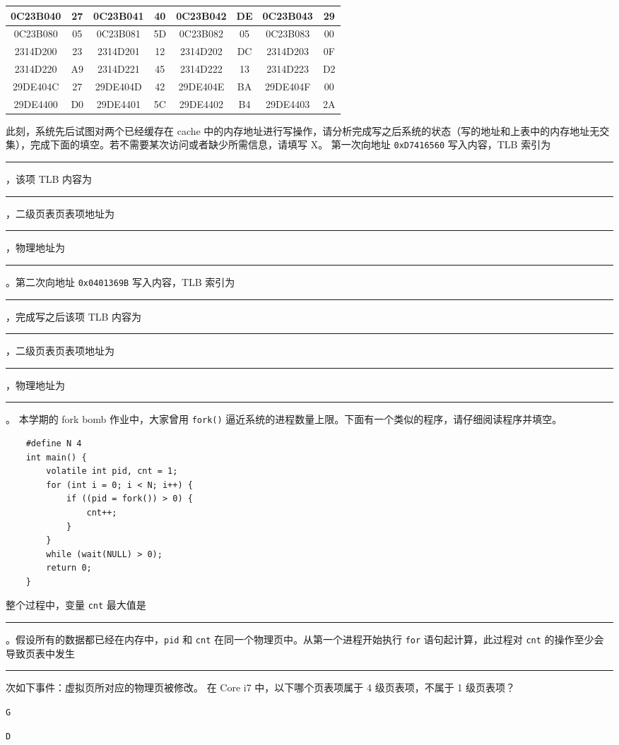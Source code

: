 \begin{problems}
\begin{table}[H]
\begin{tabular}{|c|c|c|c|c|c|c|c|}
                0C23B040 & 27 & 0C23B041 & 40 & 0C23B042 & DE & 0C23B043 & 29 \\ \hline
                0C23B080 & 05 & 0C23B081 & 5D & 0C23B082 & 05 & 0C23B083 & 00 \\ \hline
                2314D200 & 23 & 2314D201 & 12 & 2314D202 & DC & 2314D203 & 0F \\ \hline
                2314D220 & A9 & 2314D221 & 45 & 2314D222 & 13 & 2314D223 & D2 \\ \hline
                29DE404C & 27 & 29DE404D & 42 & 29DE404E & BA & 29DE404F & 00 \\ \hline
                29DE4400 & D0 & 29DE4401 & 5C & 29DE4402 & B4 & 29DE4403 & 2A \\ \hline
            \end{tabular}
        \end{table}
        此刻，系统先后试图对两个已经缓存在 cache 中的内存地址进行写操作，请分析完成写之后系统的状态（写的地址和上表中的内存地址无交集），完成下面的填空。若不需要某次访问或者缺少所需信息，请填写 X。
        第一次向地址 \verb|0xD7416560| 写入内容，TLB 索引为 \rule{2.5cm}{0.25mm}，该项 TLB 内容为 \rule{2.5cm}{0.25mm}，二级页表页表项地址为 \rule{2.5cm}{0.25mm}，物理地址为 \rule{2.5cm}{0.25mm}。第二次向地址 \verb|0x0401369B| 写入内容，TLB 索引为 \rule{2.5cm}{0.25mm}，完成写之后该项 TLB 内容为 \rule{2.5cm}{0.25mm}，二级页表页表项地址为 \rule{2.5cm}{0.25mm}，物理地址为 \rule{2.5cm}{0.25mm}。
        \qn 本学期的 fork bomb 作业中，大家曾用 \verb|fork()| 逼近系统的进程数量上限。下面有一个类似的程序，请仔细阅读程序并填空。
        \begin{verbatim}
    #define N 4
    int main() {
        volatile int pid, cnt = 1;
        for (int i = 0; i < N; i++) {
            if ((pid = fork()) > 0) {
                cnt++;
            }
        }
        while (wait(NULL) > 0);
        return 0;
    }
        \end{verbatim}
        整个过程中，变量 \verb|cnt| 最大值是 \rule{2.5cm}{0.25mm}。假设所有的数据都已经在内存中，\verb|pid| 和 \verb|cnt| 在同一个物理页中。从第一个进程开始执行 \verb|for| 语句起计算，此过程对 \verb|cnt| 的操作至少会导致页表中发生 \rule{2.5cm}{0.25mm} 次如下事件：虚拟页所对应的物理页被修改。
         在 Core i7 中，以下哪个页表项属于 4 级页表项，不属于 1 级页表项？
        \begin{choices}
            \item \verb|G|
            \item \verb|D|

\end{choices}
\end{problems}
